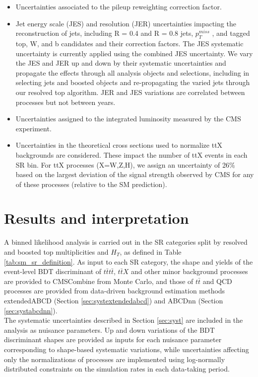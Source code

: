\documentclass[twoside]{article}
\begin{document}
\begin{itemize}
    \item Uncertainties associated to the pileup reweighting correction factor.
    \item Jet energy scale (JES) and resolution (JER) uncertainties impacting the reconstruction of jets, including R = 0.4 and R = 0.8 jets, $p_T^{miss}$ , and tagged top, W, and b candidates and their correction factors. The JES systematic uncertainty is currently applied using the combined JES uncertainty. We vary the JES and JER up and down by their systematic uncertainties and propagate the effects through all analysis objects and selections, including in selecting jets and boosted objects and re-propagating the varied jets through our resolved top algorithm. JER and JES variations are correlated between processes but not between years.
    \item Uncertainties assigned to the integrated luminosity measured by the CMS experiment.
    \item Uncertainties in the theoretical cross sections used to normalize ttX backgrounds are considered. These impact the number of ttX events in each SR bin. For ttX processes (X=W,Z,H), we assign an uncertainty of 26\% based on the largest deviation of the signal strength observed by CMS for any of these processes (relative to the SM prediction).
    
\end{itemize}

\section{Results and interpretation}
A binned likelihood analysis is carried out in the SR categories split by resolved and boosted top multiplicities and $H_T$, as defined in Table \ref{tab:sm_sr_definition}. As input to each SR category, the shape and yields of the event-level BDT discriminant of $t\bar{t}t\bar{t}$, $t\bar{t}X$ and other minor background processes are provided to CMSCombine from Monte Carlo, and those of $t\bar{t}$ and QCD processes are provided from data-driven background estimation methods extendedABCD (Section \ref{sec:systextendedabcd}) and ABCDnn (Section \ref{sec:systabcdnn}). \\

The systematic uncertainties described in Section \ref{sec:syst} are included in the analysis as nuisance parameters. Up and down variations of the BDT discriminant shapes are provided as inputs for each nuisance parameter corresponding to shape-based systematic variations, while uncertainties affecting only the normalizations of processes are implemented using log-normally distributed constraints on the simulation rates in each data-taking period.\\
\end{document}
